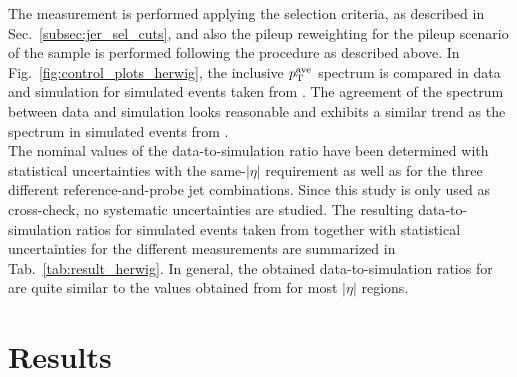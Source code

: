 The measurement is performed applying the selection criteria, as described in Sec.~\ref{subsec:jer_sel_cuts}, and also the pileup reweighting for the pileup scenario of the \herwig sample is performed following the procedure as described above. In Fig.~\ref{fig:control_plots_herwig}, the inclusive $p_{\text{T}}^\mathrm{ave}$ spectrum is compared in data and simulation for simulated events taken from \herwig. The agreement of the \ptave spectrum between data and simulation looks reasonable and exhibits a similar trend as the spectrum in simulated events from \pythia.\\
The nominal values of the data-to-simulation ratio have been determined with statistical uncertainties with the same-$|\eta|$ requirement as well as for the three different reference-and-probe jet combinations. Since this study is only used as cross-check, no systematic uncertainties are studied. The resulting data-to-simulation ratios for simulated events taken from \herwig together with statistical uncertainties for the different measurements are summarized in Tab.~\ref{tab:result_herwig}. In general, the obtained data-to-simulation ratios for \herwig are quite similar to the values obtained from \pythia for most $|\eta|$ regions. 

\section{Results}
\label{sec:jer_results}

